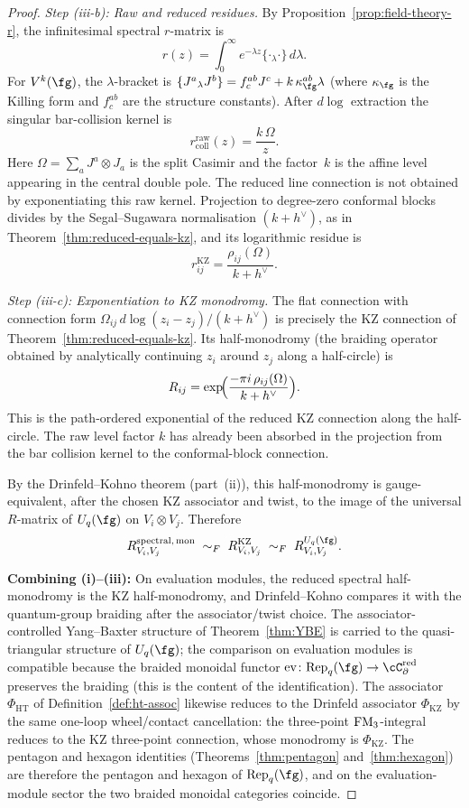 \begin{proof}
\smallskip\noindent
\emph{Step (iii-b): Raw and reduced residues.}
By Proposition~\ref{prop:field-theory-r}, the infinitesimal
spectral $r$-matrix is
\[
 r(z) = \int_0^\infty e^{-\lambda z}
 \{\cdot{}_\lambda\cdot\}\, d\lambda.
\]
For $V^k(\fg)$, the $\lambda$-bracket is
$\{J^a {}_\lambda J^b\} = f^{ab}_c J^c + k\,\kappa_\fg^{ab}\lambda$
(where $\kappa_\fg$ is the Killing form and $f^{ab}_c$ are the
structure constants). After $d\log$ extraction the singular
bar-collision kernel is
\[
 r^{\mathrm{raw}}_{\mathrm{coll}}(z)
 =
 \frac{k\,\Omega}{z}.
\]
Here $\Omega = \sum_a J^a \otimes J_a$ is the split Casimir and the
factor~$k$ is the affine level appearing in the central double pole.
The reduced line connection is not obtained by exponentiating this raw
kernel. Projection to degree-zero conformal blocks divides by the
Segal--Sugawara normalisation $(k+h^\vee)$, as in
Theorem~\ref{thm:reduced-equals-kz}, and its logarithmic residue is
\[
 r^{\mathrm{KZ}}_{ij}
 =
 \frac{\rho_{ij}(\Omega)}{k+h^\vee}.
\]

\smallskip\noindent
\emph{Step (iii-c): Exponentiation to KZ monodromy.}
The flat connection with connection form
$\Omega_{ij}\, d\log(z_i - z_j)/(k + h^\vee)$ is precisely
the KZ connection of Theorem~\ref{thm:reduced-equals-kz}.
Its half-monodromy (the braiding operator obtained by
analytically continuing $z_i$ around $z_j$ along a half-circle)
is
\[
 R_{ij} = \exp\!\Bigl(\frac{-\pi i\, \rho_{ij}(\Omega)}
 {k + h^\vee}\Bigr).
\]
This is the path-ordered exponential of the reduced KZ connection
along the half-circle. The raw level factor $k$ has already been
absorbed in the projection from the bar collision kernel to the
conformal-block connection.

By the Drinfeld--Kohno theorem (part~(ii)), this half-monodromy
is gauge-equivalent, after the chosen KZ associator and twist, to the
image of the universal $R$-matrix of $U_q(\fg)$ on
$V_i \otimes V_j$. Therefore
\[
 R_{V_i,V_j}^{\mathrm{spectral,\,mon}}
 \;\sim_F\;
 R_{V_i,V_j}^{\mathrm{KZ}}
 \;\sim_F\;
 R_{V_i,V_j}^{U_q(\fg)}.
\]

\smallskip\noindent
\textbf{Combining (i)--(iii):} On evaluation modules, the reduced
spectral half-monodromy is the KZ half-monodromy, and
Drinfeld--Kohno compares it with the quantum-group braiding after the
associator/twist choice. The associator-controlled Yang--Baxter
structure of Theorem~\ref{thm:YBE} is carried to the
quasi-triangular structure of $U_q(\fg)$; the comparison on evaluation
modules is compatible
because the braided monoidal functor
$\mathrm{ev} \colon \mathrm{Rep}_q(\fg) \to \cC_\partial^{\mathrm{red}}$
preserves the braiding (this is the content of the identification).
The associator $\Phi_{\mathrm{HT}}$ of
Definition~\ref{def:ht-assoc} likewise reduces to the Drinfeld
associator $\Phi_{\mathrm{KZ}}$ by the same one-loop wheel/contact
cancellation:
the three-point $\mathrm{FM}_3$-integral reduces to the KZ three-point
connection, whose monodromy is $\Phi_{\mathrm{KZ}}$. The pentagon
and hexagon identities
(Theorems~\ref{thm:pentagon} and~\ref{thm:hexagon}) are therefore
the pentagon and hexagon of $\mathrm{Rep}_q(\fg)$, and on the
evaluation-module sector the two braided monoidal categories
coincide.
\end{proof}

